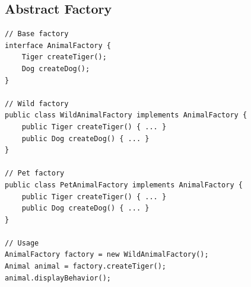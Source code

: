 \clearpage
\subsection{Abstract Factory}
\begin{lstlisting}
// Base factory
interface AnimalFactory {
    Tiger createTiger();
    Dog createDog();
}

// Wild factory
public class WildAnimalFactory implements AnimalFactory {
    public Tiger createTiger() { ... }
    public Dog createDog() { ... }
}

// Pet factory
public class PetAnimalFactory implements AnimalFactory {
    public Tiger createTiger() { ... }
    public Dog createDog() { ... }
}

// Usage
AnimalFactory factory = new WildAnimalFactory();
Animal animal = factory.createTiger();
animal.displayBehavior();
\end{lstlisting}